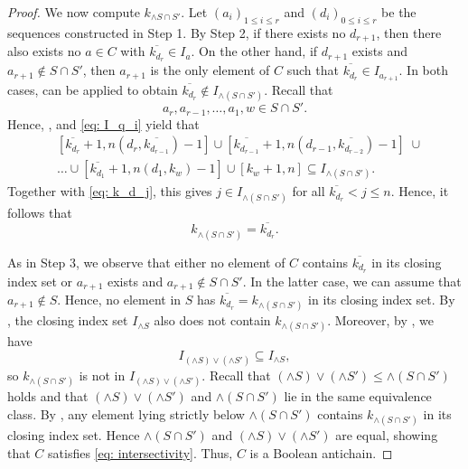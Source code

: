 \documentclass[10pt,a4paper]{amsart}
\begin{document}
\begin{proof}
     We now compute $k_{\wedge S\cap S'}$.
    Let $(a_i)_{1\leq i\leq r}$ and $(d_i)_{0 \leq i\leq r}$ be the sequences constructed in {\sf Step 1}. By {\sf Step 2}, if there exists no $d_{r+1}$, then there also exists no $a \in C$ with $\overline{k_{d_r}} \in I_a$. On the other hand, if $d_{r+1}$ exists and $a_{r+1}\notin S\cap S'$, then $a_{r+1}$ is the only element of $C$ such that $\overline{k_{d_r}} \in I_{a_{r+1}}$. In both cases,  can be applied to obtain $\overline{k_{d_r}} \notin I_{\wedge(S\cap S')}$. Recall that
    $$
    a_r,a_{r-1},\dots,a_1,w \in S\cap S'.
    $$
    Hence, ,  and \eqref{eq: I_q_i} yield that
    \begin{align*}
        &[\overline{k_{d_r}}+1,n(d_r,\overline{k_{d_{r-1}}})-1] \cup [\overline{k_{d_{r-1}}}+1,n(d_{r-1},\overline{k_{d_{r-2}}})-1]\; \cup \\ &\dots \cup [\overline{k_{d_1}}+1,n(d_1,k_w)-1] \cup 
    [k_w+1,n]\subseteq I_{\wedge(S\cap S')}.
    \end{align*}
    Together with \eqref{eq: k_d_j}, this gives $j \in I_{\wedge(S\cap S')}$ for all $\overline{k_{d_r}}<j\leq n$. Hence, it follows that 
    $$
        k_{\wedge (S \cap S')} = \overline{k_{d_r}}.
    $$
    
     As in {\sf Step 3}, we observe that either no element of $C$ contains $\overline{k_{d_{r}}}$ in its closing index set or $a_{r+1}$ exists and $a_{r+1}\notin S\cap S'$. In the latter case, we can assume that $a_{r+1} \notin S$. Hence, no element in $S$ has $\overline{k_{d_r}}=k_{\wedge (S \cap S')}$ in its closing index set. By , the closing index set $I_{\wedge S}$ also does not contain $k_{\wedge (S \cap S')}$. Moreover, by , we have 
    \[I_{(\wedge S)\vee (\wedge S')} \subseteq I_{\wedge S},\]
    so $k_{\wedge (S \cap S')}$ is not in $I_{(\wedge S)\vee (\wedge S')}$. Recall that $(\wedge S)\vee (\wedge S') \leq \wedge(S\cap S')$ holds and that $(\wedge S)\vee (\wedge S')$ and $ \wedge(S\cap S')$ lie in the same equivalence class. By , any element lying strictly below $\wedge (S\cap S')$ contains $k_{\wedge(S\cap S')}$ in its closing index set. Hence $\wedge (S\cap S')$ and $(\wedge S) \vee (\wedge S')$ are equal, showing that $C$ satisfies \eqref{eq: intersectivity}. Thus, $C$ is a Boolean antichain. 
\end{proof}
\end{document}
